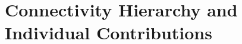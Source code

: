 \documentclass[ignorenonframetext,red,8pt,notes=hide]{beamer}
\begin{document}
%
%
%



\section{Connectivity Hierarchy and Individual Contributions}
\end{document}
